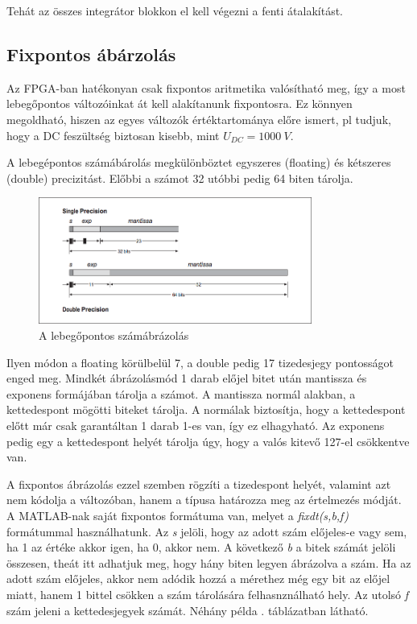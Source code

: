 Tehát az összes integrátor blokkon el kell végezni a fenti átalakítást.


\subsection{Fixpontos ábárzolás}

Az FPGA-ban hatékonyan csak fixpontos aritmetika valósítható meg, így a most lebegőpontos változóinkat át kell alakítanunk fixpontosra. Ez könnyen megoldható, hiszen az egyes változók értéktartománya előre ismert, pl tudjuk, hogy a DC feszültség biztosan kisebb, mint $U_{DC}=1000\ V$.

A lebegépontos számábárolás megkülönböztet egyszeres (floating) és kétszeres (double) precizitást. Előbbi a számot 32 utóbbi pedig 64 biten tárolja.

\begin{figure}[H]
	\centering
	\includegraphics[width = 0.8\textwidth]{figures/floating.png}
	\caption{A lebegőpontos számábrázolás} 
	\label{fig:floating}
\end{figure}

Ilyen módon a floating körülbelül 7, a double pedig 17 tizedesjegy pontosságot enged meg. Mindkét ábrázolásmód 1 darab előjel bitet után mantissza és exponens formájában tárolja a számot. A mantissza normál alakban, a kettedespont mögötti biteket tárolja. A normálak biztosítja, hogy a kettedespont előtt már csak garantáltan 1 darab 1-es van, így ez elhagyható. Az exponens pedig egy a kettedespont helyét tárolja úgy, hogy a valós kitevő 127-el csökkentve van.

A fixpontos ábrázolás ezzel szemben rögzíti a tizedespont helyét, valamint azt nem kódolja a változóban, hanem a típusa határozza meg az értelmezés módját. A MATLAB-nak saját fixpontos formátuma van, melyet a \emph{fixdt(s,b,f)} formátummal használhatunk. Az \emph{s} jelöli, hogy az adott szám előjeles-e vagy sem, ha 1 az értéke akkor igen, ha 0, akkor nem. A következő \emph{b} a bitek számát jelöli összesen, theát itt adhatjuk meg, hogy hány biten legyen ábrázolva a szám. Ha az adott szám előjeles, akkor nem adódik hozzá a mérethez még egy bit az előjel miatt, hanem 1 bittel csökken a szám tárolására felhasnználható hely. Az utolsó \emph{f} szám jeleni a kettedesjegyek számát. Néhány példa . táblázatban látható. 

